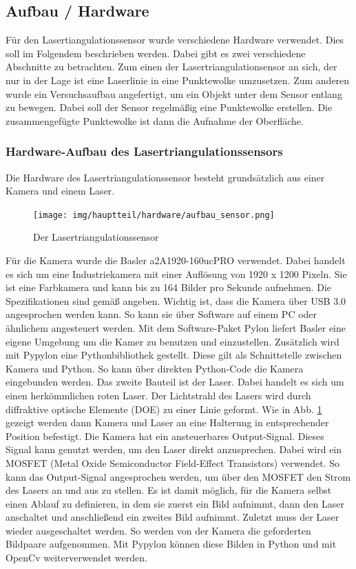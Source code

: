 	\newpage
	
	\subsection{Aufbau / Hardware}
	Für den Lasertiangulationssensor wurde verschiedene Hardware verwendet. Dies soll im Folgendem beschrieben werden. Dabei gibt es zwei verschiedene Abschnitte zu betrachten. Zum einen der Lasertriangulationsensor an sich, der nur in der Lage ist eine Laserlinie in eine Punktewolke umzusetzen. Zum anderen wurde ein Versuchsaufbau angefertigt, um ein Objekt unter dem Sensor entlang zu bewegen. Dabei soll der Sensor regelmäßig eine Punktewolke erstellen. Die zusammengefügte Punktewolke ist dann die Aufnahme der Oberfläche. 
	
		\subsubsection{Hardware-Aufbau des Lasertriangulationssensors}
		Die Hardware des Lasertriangulationssensor besteht grundsätzlich aus einer Kamera und einem Laser.
		
		\begin{figure}[h]
			\centering
			\texttt{[image: img/hauptteil/hardware/aufbau\_sensor.png]}
			\caption{Der Lasertriangulationssensor}
			\label{fig:aufbau_sensor}
		\end{figure}
		Für die Kamera wurde die Basler a2A1920-160ucPRO verwendet. Dabei handelt es sich um eine Industriekamera mit einer Auflösung von 1920 x 1200 Pixeln. Sie ist eine Farbkamera und kann bis zu 164 Bilder pro Sekunde aufnehmen. Die Spezifikationen sind gemäß \citep{noauthor_a2a1920-160ucpro_nodate} angeben. Wichtig ist, dass die Kamera über USB 3.0 angesprochen werden kann. So kann sie über Software auf einem PC oder ähnlichem angesteuert werden. Mit dem Software-Paket Pylon liefert Basler eine eigene Umgebung um die Kamer zu benutzen und einzustellen. Zusätzlich wird mit Pypylon eine Pythonbibliothek gestellt. Diese gilt als Schnittstelle zwischen Kamera und Python. So kann über direkten Python-Code die Kamera eingebunden werden. \newline
		Das zweite Bauteil ist der Laser. Dabei handelt es sich um einen herkömmlichen roten Laser. Der Lichtstrahl des Lasers wird durch diffraktive optische Elemente (DOE) zu einer Linie geformt. Wie in Abb. \ref{fig:aufbau_sensor} gezeigt werden dann Kamera und Laser an eine Halterung in entsprechender Position befestigt. \newline
		Die Kamera hat ein ansteuerbares Output-Signal. Dieses Signal kann genutzt werden, um den Laser direkt anzusprechen. Dabei wird ein MOSFET (Metal Oxide Semiconductor Field-Effect Transistors) verwendet. So kann das Output-Signal angesprochen werden, um über den MOSFET den Strom des Lasers an und aus zu stellen. Es ist damit möglich, für die Kamera selbst einen Ablauf zu definieren, in dem sie zuerst ein Bild aufnimmt, dann den Laser anschaltet und anschließend ein zweites Bild aufnimmt. Zuletzt muss der Laser wieder ausgeschaltet werden. So werden von der Kamera die geforderten Bildpaare aufgenommen. Mit Pypylon können diese Bilden in Python und mit OpenCv weiterverwendet werden.
		
